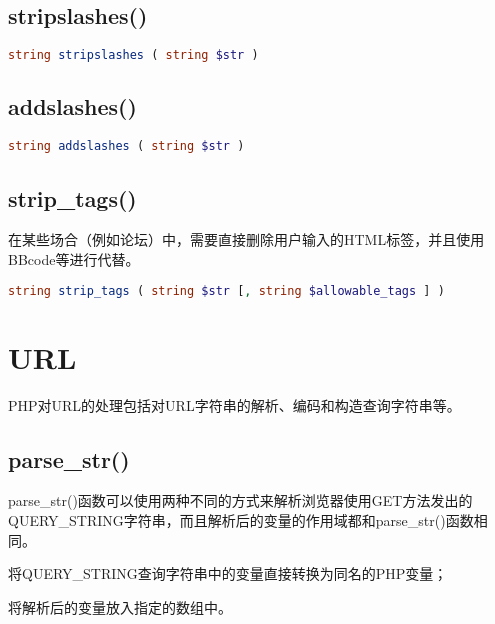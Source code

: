 \subsection{stripslashes()}




\begin{lstlisting}[language=PHP]
string stripslashes ( string $str )
\end{lstlisting}

\subsection{addslashes()}





\begin{lstlisting}[language=PHP]
string addslashes ( string $str )
\end{lstlisting}

\subsection{strip\_tags()}

在某些场合（例如论坛）中，需要直接删除用户输入的HTML标签，并且使用BBcode等进行代替。




\begin{lstlisting}[language=PHP]
string strip_tags ( string $str [, string $allowable_tags ] )
\end{lstlisting}


\section{URL}

PHP对URL的处理包括对URL字符串的解析、编码和构造查询字符串等。



\subsection{parse\_str()}



parse\_str()函数可以使用两种不同的方式来解析浏览器使用GET方法发出的QUERY\_STRING字符串，而且解析后的变量的作用域都和parse\_str()函数相同。

\begin{compactitem}
\item 将QUERY\_STRING查询字符串中的变量直接转换为同名的PHP变量；
\item 将解析后的变量放入指定的数组中。
\end{compactitem}

